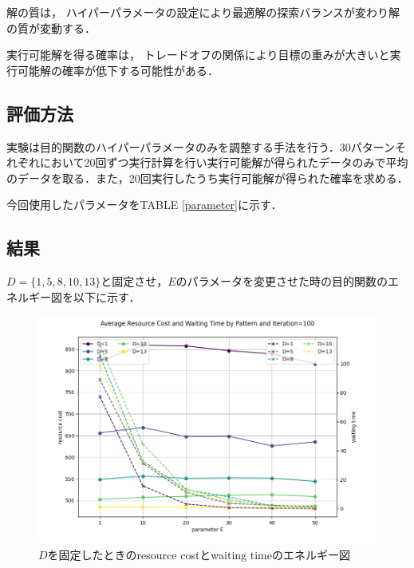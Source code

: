 \documentclass[conference]{IEEEtran}
\begin{document}
解の質は， ハイパーパラメータの設定により最適解の探索バランスが変わり解の質が変動する．

実行可能解を得る確率は， トレードオフの関係により目標の重みが大きいと実行可能解の確率が低下する可能性がある．
\subsection{評価方法}
実験は目的関数のハイパーパラメータのみを調整する手法を行う．30パターンそれぞれにおいて20回ずつ実行計算を行い実行可能解が得られたデータのみで平均のデータを取る．また，20回実行したうち実行可能解が得られた確率を求める．

今回使用したパラメータをTABLE \ref{parameter}に示す．

\subsection{結果}
$D=\{1,5,8,10,13\}$と固定させ，$E$のパラメータを変更させた時の目的関数のエネルギー図を以下に示す．
\begin{figure}[htbp]
\centerline{\includegraphics[scale=0.4]{./fig/D.pdf}}
\caption{$D$を固定したときのresource costとwaiting timeのエネルギー図}
\label{fig2}
\end{figure}
\end{document}
